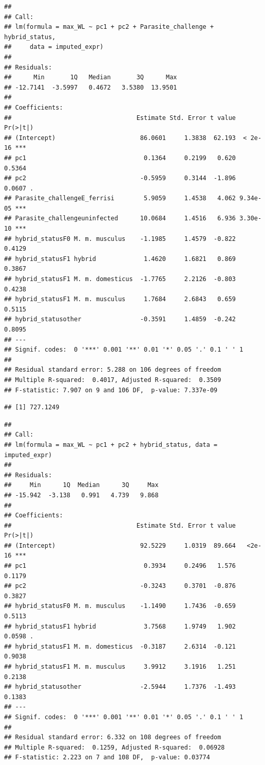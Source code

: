 \documentclass[
]{article}
\begin{document}
\begin{verbatim}
## 
## Call:
## lm(formula = max_WL ~ pc1 + pc2 + Parasite_challenge + hybrid_status, 
##     data = imputed_expr)
## 
## Residuals:
##      Min       1Q   Median       3Q      Max 
## -12.7141  -3.5997   0.4672   3.5380  13.9501 
## 
## Coefficients:
##                                  Estimate Std. Error t value Pr(>|t|)    
## (Intercept)                       86.0601     1.3838  62.193  < 2e-16 ***
## pc1                                0.1364     0.2199   0.620   0.5364    
## pc2                               -0.5959     0.3144  -1.896   0.0607 .  
## Parasite_challengeE_ferrisi        5.9059     1.4538   4.062 9.34e-05 ***
## Parasite_challengeuninfected      10.0684     1.4516   6.936 3.30e-10 ***
## hybrid_statusF0 M. m. musculus    -1.1985     1.4579  -0.822   0.4129    
## hybrid_statusF1 hybrid             1.4620     1.6821   0.869   0.3867    
## hybrid_statusF1 M. m. domesticus  -1.7765     2.2126  -0.803   0.4238    
## hybrid_statusF1 M. m. musculus     1.7684     2.6843   0.659   0.5115    
## hybrid_statusother                -0.3591     1.4859  -0.242   0.8095    
## ---
## Signif. codes:  0 '***' 0.001 '**' 0.01 '*' 0.05 '.' 0.1 ' ' 1
## 
## Residual standard error: 5.288 on 106 degrees of freedom
## Multiple R-squared:  0.4017, Adjusted R-squared:  0.3509 
## F-statistic: 7.907 on 9 and 106 DF,  p-value: 7.337e-09
\end{verbatim}

\begin{verbatim}
## [1] 727.1249
\end{verbatim}

\begin{verbatim}
## 
## Call:
## lm(formula = max_WL ~ pc1 + pc2 + hybrid_status, data = imputed_expr)
## 
## Residuals:
##     Min      1Q  Median      3Q     Max 
## -15.942  -3.138   0.991   4.739   9.868 
## 
## Coefficients:
##                                  Estimate Std. Error t value Pr(>|t|)    
## (Intercept)                       92.5229     1.0319  89.664   <2e-16 ***
## pc1                                0.3934     0.2496   1.576   0.1179    
## pc2                               -0.3243     0.3701  -0.876   0.3827    
## hybrid_statusF0 M. m. musculus    -1.1490     1.7436  -0.659   0.5113    
## hybrid_statusF1 hybrid             3.7568     1.9749   1.902   0.0598 .  
## hybrid_statusF1 M. m. domesticus  -0.3187     2.6314  -0.121   0.9038    
## hybrid_statusF1 M. m. musculus     3.9912     3.1916   1.251   0.2138    
## hybrid_statusother                -2.5944     1.7376  -1.493   0.1383    
## ---
## Signif. codes:  0 '***' 0.001 '**' 0.01 '*' 0.05 '.' 0.1 ' ' 1
## 
## Residual standard error: 6.332 on 108 degrees of freedom
## Multiple R-squared:  0.1259, Adjusted R-squared:  0.06928 
## F-statistic: 2.223 on 7 and 108 DF,  p-value: 0.03774
\end{verbatim}
\end{document}
